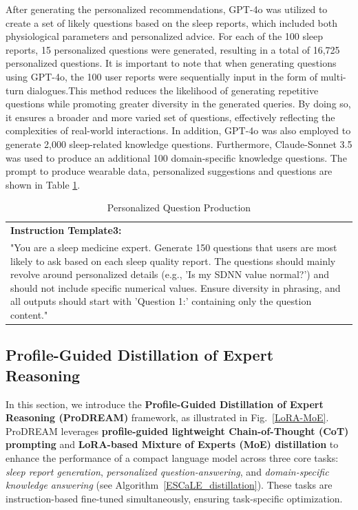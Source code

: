 \documentclass[preprint,12pt]{elsarticle}
\begin{document}
After generating the personalized recommendations, GPT-4o was utilized to create a set of likely questions based on the sleep reports, which included both physiological parameters and personalized advice. For each of the 100 sleep reports, 15 personalized questions were generated, resulting in a total of 16,725 personalized questions. It is important to note that when generating questions using GPT-4o, the 100 user reports were sequentially input in the form of multi-turn dialogues.This method reduces the likelihood of generating repetitive questions while promoting greater diversity in the generated queries. By doing so, it ensures a broader and more varied set of questions, effectively reflecting the complexities of real-world interactions. In addition, GPT-4o was also employed to generate 2,000 sleep-related knowledge questions. Furthermore, Claude-Sonnet 3.5 was used to produce an additional 100 domain-specific knowledge questions. The prompt to produce wearable data, personalized suggestions and questions are shown in Table \ref{template3}.
\begin{table}[t]
\centering
\caption{Personalized Question Production}
\label{template3}
\begin{tabular}{@{}p{}@{}}
\toprule
\textbf{Instruction Template3:} \\[2mm]
"You are a sleep medicine expert. Generate 150 questions that users are most likely to ask based on each sleep quality report. The questions should mainly revolve around personalized details (e.g., 'Is my SDNN value normal?') and should not include specific numerical values. Ensure diversity in phrasing, and all outputs should start with 'Question 1:' containing only the question content."
\\[1mm]
\bottomrule
\end{tabular}
\end{table}

\subsection{Profile-Guided Distillation of Expert Reasoning}

In this section, we introduce the \textbf{Profile-Guided Distillation of Expert Reasoning (ProDREAM)} framework, as illustrated in Fig.~\ref{LoRA-MoE}. ProDREAM leverages \textbf{profile-guided lightweight Chain-of-Thought (CoT) prompting} and \textbf{LoRA-based Mixture of Experts (MoE) distillation} to enhance the performance of a compact language model across three core tasks: \textit{sleep report generation}, \textit{personalized question-answering}, and \textit{domain-specific knowledge answering} (see Algorithm~\ref{ESCaLE_distillation}). These tasks are instruction-based fine-tuned simultaneously, ensuring task-specific optimization.
\end{document}
